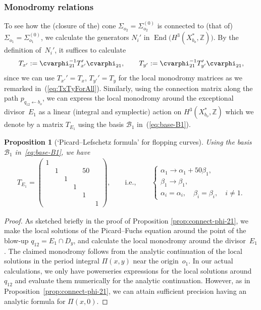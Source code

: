 \documentclass[10pt,a4paper]{amsart}
\numberwithin{equation}{section}
\newtheorem{Proposition}[Theorem]{Proposition}
\begin{document}
\subsubsection{Monodromy relations}
To see how the (closure of the) cone $\Sigma_{o_{2}}=\Sigma_{o_{2}}^{(0)}$ is connected to (that of) $\Sigma_{o_{1}}=\Sigma_{o_{1}}^{(0)}$, we calculate the generators $N_{i}'$ in $\operatorname{End}\big(H^{3}(X_{b_{o}}^{*},\mathbb{Z})\big)$. By the definition of~$N_{i}'$, it suffices to calculate
\begin{gather*}
T_{x'}:=\cvarphi_{21}^{-1} T_{x'}^{\prime} \cvarphi_{21},\qquad T_{y'}:=\cvarphi_{21}^{-1} T_{y'}^{\prime} \cvarphi_{21},
\end{gather*}
since we can use $T_{x'}'=T_{x}$, $T_{y'}'=T_{y}$ for the local monodromy matrices as we remarked in~(\ref{eq:TxTyForAll}). Similarly, using the connection matrix along the path $p_{q_{12}\leftarrow b_{o}}$, we can express the local monodromy around the exceptional divisor~$E_{1}$ as a linear (integral and symplectic) action on $H^{3}(X_{b_{o}}^{*},\mathbb{Z})$ which we denote by a matrix $T_{E_{1}}$ using the basis $\mathcal{B}_{1}$ in~(\ref{eq:base-B1}).
\begin{Proposition}[`Picard--Lefschetz formula' for flopping curves] \label{prop:Picard-Lefschetz-Reye}Using the basis $\mathcal{B}_{1}$ in~\eqref{eq:base-B1}, we have
\begin{gather*}
T_{E_{1}}=\left(\begin{smallmatrix}1\\
 & 1 & & & 50\\
 & & 1\\
 & & & 1\\
 & & & & 1\\
 & & & & & 1
\end{smallmatrix}\right), \qquad \text{i.e.}, \qquad \begin{cases}
\alpha_{1}\to\alpha_{1}+50\beta_{1},\\
\beta_{1}\to\beta_{1},\\
\alpha_{i}=\alpha_{i},\quad \beta_{i}=\beta_{i},\quad i\not=1.
\end{cases}%
\end{gather*}
\end{Proposition}
\begin{proof}As sketched briefly in the proof of Proposition \ref{prop:connect-phi-21}, we make the local solutions of the Picard--Fuchs equation around the point of the blow-up $q_{12}=E_{1}\cap D_{y}$, and calculate the local monodromy around the divisor~$E_{1}$. The claimed monodromy
follows from the analytic continuation of the local solutions in the period integral $\Pi(x,y)$ near the origin~$o_{1}$. In our actual calculations, we only have powerseries expressions for the local solutions around $q_{12}$ and evaluate them numerically for the analytic continuation. However, as in Proposition~\ref{prop:connect-phi-21}, we can attain sufficient precision having an analytic formula for $\Pi(x,0)$. \end{proof}
\end{document}
